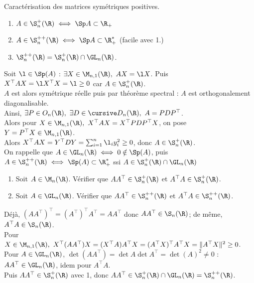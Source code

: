\documentclass[11pt]{article}
\begin{document}
\begin{prop}{Caractérisation des matrices symétriques positives.}{}
    \begin{enumerate}
        \item $A \in \S_n^{+}(\R) \iff \Sp A \subset \R_+$
        \item $A \in \S_n^{++}(\R) \iff \Sp A \subset \R_+^*$ (facile avec 1.)
        \item $\S_n^{++}(\R)=\S_n^+(\R)\cap\GL_n(\R)$.
    \end{enumerate}
    \tcblower
     Soit $\l\in\Sp(A)$ : $\exists X\in\M_{n,1}(\R), ~ AX=\l X$. Puis $X^\top AX = \l X^\top X = \l \geq 0$ car $A\in\S_n^+(\R)$.\\
     $A$ est alors symétrique réelle puis par théorème spectral : $A$ est orthogonalement diagonalisable.\\
    Ainsi, $\exists P \in O_n(\R), ~ \exists D \in \D_n(\R), ~ A=PDP^\top$.\\
    Alors pour $X\in \M_{n,1}(\R), ~ X^\top AX = X^\top PDP^\top X$, on pose $Y=P^{\top}X\in\M_{n,1}(\R)$.\\
    Alors $X^\top AX = Y^\top DY = \sum_{i=1}^n\l_i y_i^2 \geq 0$, donc $A\in\S_n^+(\R)$.\\
     On rappelle que $A\in\GL_n(\R) \iff 0 \notin \Sp(A)$, puis $A\in\S_n^{++}(\R) \iff \Sp(A) \subset \R_+^*$ ssi $A\in\S_n^+(\R)\cap \GL_n(\R)$
\end{prop}

\begin{exercice}{}{}
    \begin{enumerate}
        \item Soit $A\in\M_n(\R)$. Vérifier que $AA^\top\in\S_n^+(\R)$ et $A^\top A \in \S_n^+(\R)$.
        \item Soit $A\in\GL_n(\R)$. Vérifier que $AA^\top\in\S_n^{++}(\R)$ et $A^\top A\in\S_n^{++}(\R)$.
    \end{enumerate}
    \tcblower
     Déjà, $(AA^\top)^\top = (A^\top)^\top A^\top = AA^\top$ donc $AA^\top \in \S_n(\R)$; de même, $A^\top A \in \S_n(\R)$.\\
    Pour $X\in\M_{n,1}(\R), ~ X^\top(AA^\top)X = (X^\top A)A^\top X = (A^\top X)^\top A^\top X = \|A^\top X\|^2 \geq 0$.\\
     Pour $A\in\GL_n(\R)$, $\det(AA^\top)=\det A \det A^\top = \det(A)^2 \neq 0$ : $AA^\top \in \GL_n(\R)$, idem pour $A^\top A$.\\
    Puis $AA^\top \in \S_n^+(\R)$ avec 1, donc $AA^\top \in \S_n^+(\R)\cap \GL_n(\R)=\S_n^{++}(\R)$.
\end{exercice}
\end{document}
